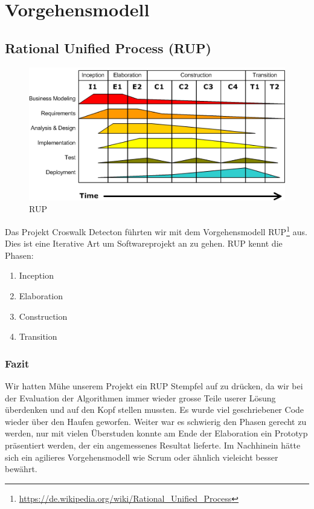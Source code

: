 \section{Vorgehensmodell}
\subsection{Rational Unified Process (RUP)}

\begin{figure}[H]
\centering
\includegraphics[width=\textwidth]{images/rup.png}
\caption[RUP]{RUP}
\end{figure}

Das Projekt Croswalk Detecton führten wir mit dem Vorgehensmodell RUP\footnote{\url{https://de.wikipedia.org/wiki/Rational_Unified_Process}} aus.
Dies ist eine Iterative Art um Softwareprojekt an zu gehen. RUP kennt die Phasen:

\begin{enumerate}
	\item Inception
	\item Elaboration
	\item Construction
	\item Transition
\end{enumerate}

\subsubsection{Fazit}
Wir hatten Mühe unserem Projekt ein RUP Stempfel auf zu drücken, da wir bei der Evaluation der Algorithmen immer wieder grosse Teile userer Lösung überdenken und auf den Kopf stellen mussten. Es wurde viel geschriebener Code wieder über den Haufen geworfen. Weiter war es schwierig den Phasen gerecht zu werden, nur mit vielen Überstuden konnte am Ende der Elaboration ein Prototyp präsentiert werden, der ein angemessenes Resultat lieferte. Im Nachhinein hätte sich ein agilieres Vorgehensmodell wie Scrum oder ähnlich vieleicht besser bewährt.
 

